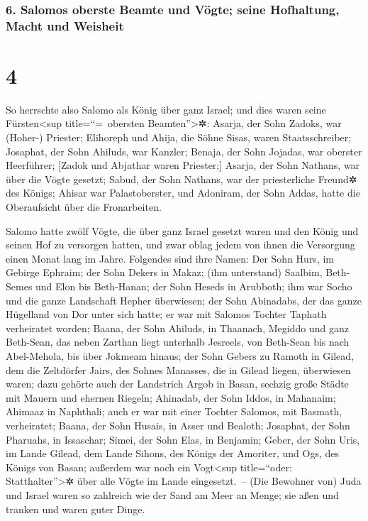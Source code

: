 \hypertarget{salomos-oberste-beamte-und-vuxf6gte-seine-hofhaltung-macht-und-weisheit}{%
\subsubsection{6. Salomos oberste Beamte und Vögte; seine Hofhaltung,
Macht und
Weisheit}\label{salomos-oberste-beamte-und-vuxf6gte-seine-hofhaltung-macht-und-weisheit}}

\hypertarget{section-3}{%
\section{4}\label{section-3}}

So herrschte also Salomo als König über ganz Israel;
und dies waren seine Fürsten\textless sup
title=``=~obersten Beamten''\textgreater✲: Asarja, der Sohn Zadoks, war
(Hoher-) Priester; Elihoreph und Ahija, die Söhne Sisas,
waren Staatsschreiber; Josaphat, der Sohn Ahiluds, war Kanzler;
Benaja, der Sohn Jojadas, war oberster Heerführer;
{[}Zadok und Abjathar waren Priester;{]} Asarja, der Sohn
Nathans, war über die Vögte gesetzt; Sabud, der Sohn Nathans, war der
priesterliche Freund✲ des Königs; Ahisar war
Palastoberster, und Adoniram, der Sohn Addas, hatte die Oberaufsicht
über die Fronarbeiten.

Salomo hatte zwölf Vögte, die über ganz Israel gesetzt
waren und den König und seinen Hof zu versorgen hatten, und zwar oblag
jedem von ihnen die Versorgung einen Monat lang im Jahre.
Folgendes sind ihre Namen: Der Sohn Hurs, im Gebirge
Ephraim; der Sohn Dekers in Makaz; (ihm unterstand)
Saalbim, Beth-Semes und Elon bis Beth-Hanan; der Sohn
Heseds in Arubboth; ihm war Socho und die ganze Landschaft Hepher
überwiesen; der Sohn Abinadabs, der das ganze Hügelland
von Dor unter sich hatte; er war mit Salomos Tochter Taphath verheiratet
worden; Baana, der Sohn Ahiluds, in Thaanach, Megiddo und
ganz Beth-Sean, das neben Zarthan liegt unterhalb Jesreels, von
Beth-Sean bis nach Abel-Mehola, bis über Jokmeam hinaus;
der Sohn Gebers zu Ramoth in Gilead, dem die Zeltdörfer
Jairs, des Sohnes Manasses, die in Gilead liegen, überwiesen waren; dazu
gehörte auch der Landstrich Argob in Basan, sechzig große Städte mit
Mauern und ehernen Riegeln; Ahinadab, der Sohn Iddos, in
Mahanaim; Ahimaaz in Naphthali; auch er war mit einer
Tochter Salomos, mit Basmath, verheiratet; Baana, der
Sohn Husais, in Asser und Bealoth; Josaphat, der Sohn
Pharuahs, in Issaschar; Simei, der Sohn Elas, in
Benjamin; Geber, der Sohn Uris, im Lande Gilead, dem
Lande Sihons, des Königs der Amoriter, und Ogs, des Königs von Basan;
außerdem war noch ein Vogt\textless sup title=``oder:
Statthalter''\textgreater✲ über alle Vögte im Lande eingesetzt.~--
(Die Bewohner von) Juda und Israel waren so zahlreich wie
der Sand am Meer an Menge; sie aßen und tranken und waren guter Dinge.

